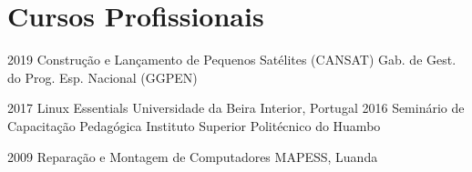 \vspace{-1.3cm}
\newpage
\section{Cursos Profissionais}

\begin{entrada}




\cursos
{2019}
{Construção e Lançamento de Pequenos Satélites (CANSAT)}
{Gab. de Gest. do Prog. Esp. Nacional (GGPEN)}
{\vspace{-0.3cm}}

\cursos
{2017}
{Linux Essentials}
{Universidade da Beira Interior, Portugal}
{\vspace{-0.3cm}}
\cursos
{2016}
{Seminário de Capacitação Pedagógica}
{Instituto Superior Politécnico do Huambo}
{\vspace{-0.3cm}}

\cursos
{2009}
{Reparação e Montagem de Computadores}
{MAPESS, Luanda}
{\vspace{-0.3cm}}
\end{entrada}

